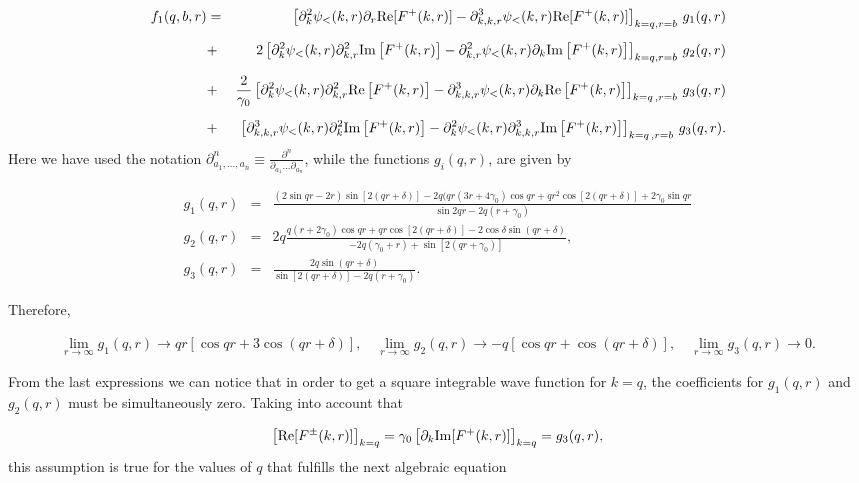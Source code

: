 \documentclass[a4paper]{jpconf}
\begin{document}
\begin{eqnarray*}
f_1(q,b,r)&=& \left[\partial^2_k\psi_{<}(k,r)\partial_r {\rm Re}[F^{+} (k,r)]- \partial^3_{k,k,r}\psi_{<} (k,r){\rm Re}[F^{+}(k,r)]\right]_{k=q,r=b} \,g_1(q,r)\\[0.2cm]
&+&2\left[\partial^2_k\psi_{<}(k,r) \partial^2_{k,r}{\rm Im}\left[F^{+}(k,r)\right] - \partial^2_{k,r}\psi_{<}(k,r)\partial_k {\rm Im} \left[F^{+}(k,r)\right]\right]_{k=q,r=b}\, g_2(q,r)\\[0.2cm]
&+&\frac{2}{\gamma_0}\left[\partial^2_k \psi_{<}(k,r) \partial^2_{k,r}{\rm Re}\left[F^{+}(k,r)\right] - \partial^3_{k,k,r}\psi_{<}(k,r) \partial_k {\rm Re}\left[F^{+}(k,r)\right]\right]_{k=q\,,r=b} \,g_3(q,r)\\[0.2cm]
&+&\left[\partial^3_{k,k,r}\psi_{<}(k,r)\partial^2_k {\rm Im}\left[F^{+}(k,r)\right] - \partial^2_k\psi_{<}(k,r)\partial^3_{k,k,r}{\rm Im}\left[F^{+}(k,r)\right]\right]_{k=q\,,r=b}\, g_3(q,r).
\end{eqnarray*}
Here we have used the notation $\partial_{a_1,...,a_n}^n\equiv \frac{\partial^n}{\partial_{a_1}...\partial_{a_n}}$, while the functions $g_i(q,r)$, are given by

\begin{eqnarray*}
g_1(q,r)&=&\frac{(2 \sin{qr} - 2r ) \sin{[2 (q r + \delta)]} - 
2 q (q r (3 r + 4 \gamma_0) \cos{qr} + 
q r^2 \cos{[2 (q r + \delta)]} + 2 \gamma_0 \sin{qr}}{\sin{2qr}-2q(r+\gamma_0)}\\[0.2cm] 
g_2(q,r)&=& 2q \frac{q(r + 2 \gamma_0) \cos{qr} + qr \cos{[2(qr + \delta)]} - 
2\cos{\delta} \sin{(q r + \delta)}}{-2q(\gamma_0+r)+\sin{[2(qr+\gamma_0)]}},\\[0.2cm] 
g_3(q,r)&=&\frac{2q\sin{(qr + \delta)}}{\sin{[2(qr+\delta)]}-2q(r+\gamma_0)}. 
\end{eqnarray*}

Therefore, 

\begin{eqnarray*}
\lim_{r\rightarrow\infty}g_1(q,r)\rightarrow qr[\cos{qr} + 3 \cos{(qr + \delta)}],\quad
\lim_{r\rightarrow\infty}g_2(q,r)\rightarrow-q[\cos{qr} + \cos{(qr + \delta)}],\quad
\lim_{r\rightarrow\infty}g_3(q,r)\rightarrow0.
\end{eqnarray*}

From the last expressions we can notice that in order to get a square integrable wave function for $k=q$, the coefficients for $g_1(q,r)$ and $g_2(q,r)$ must be simultaneously zero. Taking into account that 

\begin{eqnarray*}\left[{\rm Re}[F^{\pm}(k,r)]\right]_{k=q}=\gamma_0\left[\partial_k{\rm Im}[F^{+}(k,r)]\right]_{k=q}=g_3(q,r),\end{eqnarray*} 
this assumption is true for the values of $q$ that fulfills the next algebraic equation
\end{document}
